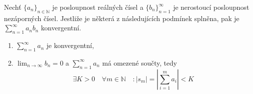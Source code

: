 \begin{vetat}
Nechť $\{a_n\}_{n \in \mathbb{N}}$ je posloupnost reálných čísel a $\{b_n\}_{n=1}^{\infty}$ je nerostoucí posloupnost nezáporných čísel. Jestliže je některá z následujících podmínek splněna, pak je $\sum_{n=1}^{\infty} a_n b_n$ konvergentní.
\begin{enumerate}
\item $\sum_{n=1}^{\infty} a_n$ je konvergentní,
\item $\lim_{n \rightarrow \infty} b_n = 0$ a $\sum_{n=1}^{\infty} a_n$ má omezené součty, tedy
$$\exists K > 0 \quad \forall m \in \mathbb{N} \quad : | s_m | = \left| \sum_{i=1}^{m} a_i  \right| < K$$
\end{enumerate}
\end{vetat}